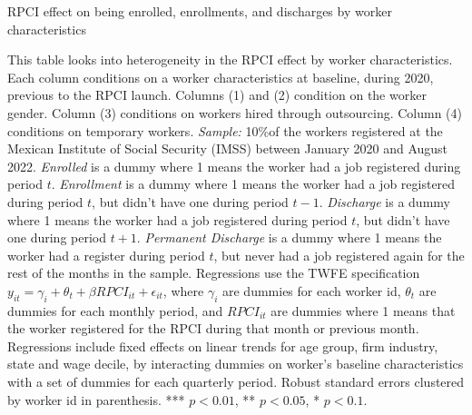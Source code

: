 \documentclass[oneside,11pt]{article}
\begin{document}
\clearpage

\begin{table}[H]
    \caption{RPCI effect on being enrolled, enrollments, and discharges by worker characteristics}
    \label{twfe_job_hetero_wrk_char}
    \begin{center}
    \scriptsize{}
    \end{center}
\end{table}
\scriptsize{
\noindent This table looks into heterogeneity in the RPCI effect by worker characteristics. Each column conditions on a worker characteristics at baseline, during 2020, previous to the RPCI launch. Columns (1) and (2) condition on the worker gender. Column (3) conditions on workers hired through outsourcing. Column (4) conditions on temporary workers. \textit{Sample:} 10\%of the workers registered at the Mexican Institute of Social Security (IMSS) between January 2020 and August 2022. \textit{Enrolled} is a dummy where 1 means the worker had a job registered during period $t$. \textit{Enrollment} is a dummy where 1 means the worker had a job registered during period $t$, but didn't have one during period $t-1$. \textit{Discharge} is a dummy where 1 means the worker had a job registered during period $t$, but didn't have one during period $t+1$. \textit{Permanent Discharge} is a dummy where 1 means the worker had a register during period $t$, but never had a job registered again for the rest of the months in the sample. Regressions use the TWFE specification $y_{it} = \gamma_{i} + \theta_{t}+ \beta RPCI_{it} +\epsilon_{it}$, where $\gamma_{i}$ are dummies for each worker id, $\theta_{t}$ are dummies for each monthly period, and $RPCI_{it}$ are dummies where 1 means that the worker registered for the RPCI during that month or previous month. Regressions include fixed effects on linear trends for age group, firm industry, state and wage decile, by interacting dummies on worker's baseline characteristics with a set of dummies for each quarterly period. Robust standard errors clustered by worker id in parenthesis. *** $p<0.01$, ** $p<0.05$, * $p<0.1$.
}

\clearpage
\end{document}
